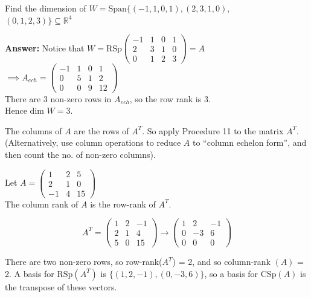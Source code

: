 \documentclass[twoside]{scrartcl}
\begin{document}
\begin{example} Find the dimension of $W = \text{Span}\{(-1,1,0,1),(2,3,1,0),$\\$(0,1,2,3)\} \subseteq \mathbb{R}^4$

 \textbf{Answer:} Notice that $W = \text{RSp} \begin{pmatrix}
 -1 & 1 & 0 & 1\\ 2 & 3 & 1 & 0\\ 0 & 1 & 2 & 3
 \end{pmatrix} = A$\\
 
 $\implies A_{ech} =  
 \begin{pmatrix}
 -1 & 1 & 0 & 1 \\ 0 & 5 & 1 & 2 \\ 0 & 0 & 9 & 12
 \end{pmatrix}
 $\\
 
There are 3 non-zero rows in $A_{ech}$, so the row rank is 3.\\ Hence dim $W = 3$.
\end{example}\vspace*{10pt}

\begin{proc}The columns of $A$ are the rows of $A^T$. So apply Procedure 11 to the matrix $A^T$. (Alternatively, use column operations to reduce $A$ to ``column echelon form'', and then count the no. of non-zero columns).\end{proc}

\begin{example} Let $A = \begin{pmatrix}
 1 & 2 & 5\\ 2 & 1 & 0\\ -1 &4 & 15
 \end{pmatrix}
 $\\
 
 The column rank of $A$ is the row-rank of $A^T$.
 
 \[A^T = \begin{pmatrix}
 1 & 2 & -1\\ 2 & 1 & 4\\ 5 & 0 & 15
 \end{pmatrix}
 \to 
 \begin{pmatrix}
 1 & 2 & -1\\ 0 & -3 & 6\\ 0 & 0 & 0
 \end{pmatrix}\]
 
 There are two non-zero rows, so row-rank($A^T$) = 2, and so column-rank $(A)$ = 2. A basis for $\text{RSp}(A^T)$ is $\{(1,2,-1),(0,-3,6)\}$, so a basis for $\text{CSp}(A)$ is the transpose of these vectors.
 \end{example}
 
\end{document}
